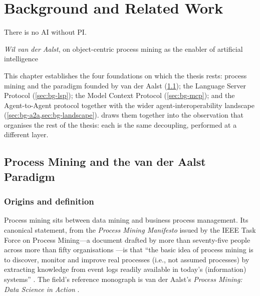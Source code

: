\chapter{Background and Related Work}
\label{ch:background}

\epigraph{There is no AI without PI.}{\textit{Wil van der Aalst}, on
object-centric process mining as the enabler of artificial intelligence
\citep{noai-nopi-2025}}

This chapter establishes the four foundations on which the thesis rests: process
mining and the paradigm founded by van der Aalst (\cref{sec:bg-pm}); the Language
Server Protocol (\cref{sec:bg-lsp}); the Model Context Protocol
(\cref{sec:bg-mcp}); and the Agent-to-Agent protocol together with the wider
agent-interoperability landscape (\cref{sec:bg-a2a,sec:bg-landscape}).
 draws them together into the observation that organises
the rest of the thesis: each is the same decoupling, performed at a different
layer.

\section{Process Mining and the van der Aalst Paradigm}
\label{sec:bg-pm}

\subsection{Origins and definition}

Process mining sits between data mining and business process management. Its
canonical statement, from the \emph{Process Mining Manifesto} issued by the IEEE
Task Force on Process Mining---a document drafted by more than seventy-five people
across more than fifty organisations \citep{tfpm-manifesto}---is that ``the basic
idea of process mining is to discover, monitor and improve real processes
(i.e., not assumed processes) by extracting knowledge from event logs readily
available in today's (information) systems'' \citep{pm-manifesto-2011}. The
field's reference monograph is van der Aalst's \emph{Process Mining: Data Science
in Action} \citep{vdaalst-book-2016}.

